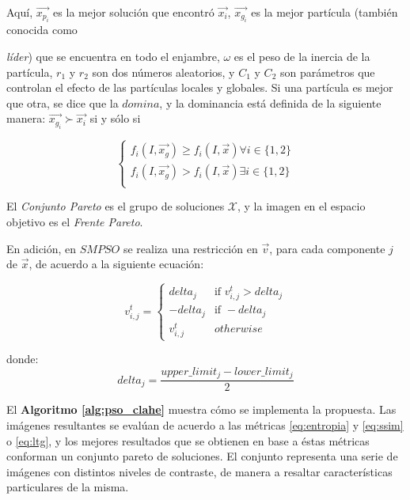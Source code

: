 \documentclass[spanish,twocolumn]{article}
\begin{document}
Aquí, $\overrightarrow{x_{p_i}}$ es la mejor solución que encontró $\overrightarrow{x_i}$, $\overrightarrow{x_{g_i}}$ es la mejor partícula (también conocida como {{\it líder}) que se encuentra en todo el enjambre, $\omega$ es el peso de la inercia de la partícula, $r_1$ y $r_2$ son dos números aleatorios, y $C_1$ y $C_2$ son parámetros que controlan el efecto de las partículas locales  y globales. Si una partícula es mejor que otra, se dice que la $domina$, y la dominancia está definida de la siguiente manera: $\overrightarrow{x_{g_i}} \succ \overrightarrow{x_i}$ si y sólo si

\begin{equation}\label{eq:dominanciapareto}
         \begin{cases}  f_i(I,\overrightarrow{x_{g}})  \geq f_i(I,\overrightarrow{x}) \forall i \in \{1,2\} \\
                        f_i(I,\overrightarrow{x_{g}}) > f_i(I,\overrightarrow{x}) \exists i \in \{1,2\} \\
         \end{cases}
\end{equation}

El {\it Conjunto Pareto} es el grupo de soluciones $\mathscr{X}$, y la imagen en el espacio objetivo es el {\it Frente Pareto}.

En adición, en $SMPSO$ se realiza una restricción en $\overrightarrow{v}$, para cada componente $j$ de $\overrightarrow{x}$, de acuerdo a la siguiente ecuación: 
                
\begin{equation}\label{eq:restricciondelta}
    v_{i,j}^t = \begin{cases}  delta_j &\mbox{if } v_{i,j}^t > delta_j \\
                                -delta_j & \mbox{if } -delta_j \\
                                v_{i,j}^t & otherwise \end{cases}
\end{equation}

donde: 
\begin{equation} \label{eq:restricciondelta2}
delta_j= \frac{upper\_limit_j - lower\_limit_j}{2}
\end{equation}

El \textbf{Algoritmo \ref{alg:pso_clahe}} muestra cómo se implementa la propuesta. Las imágenes resultantes se evalúan de acuerdo a las métricas \eqref{eq:entropia} y \eqref{eq:ssim} o \eqref{eq:ltg}, y los mejores resultados que se obtienen en base a éstas métricas conforman un conjunto pareto de soluciones. El conjunto representa una serie de imágenes con distintos niveles de contraste, de manera a resaltar características particulares de la misma.

}
\end{document}
